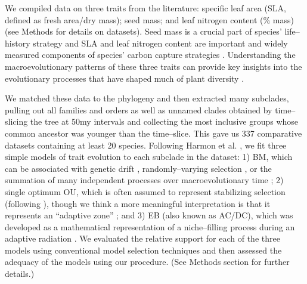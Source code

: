 \documentclass[a4paper,12pt]{article}
\begin{document}
We compiled data on three traits from the literature: specific leaf area (SLA, defined as fresh area/dry mass); seed mass; and leaf nitrogen content (\% mass) (see Methods for details on datasets). Seed mass is a crucial part of species' life--history strategy \citep{Leishman2000, Westoby2002} and SLA and leaf nitrogen content are important and widely measured components of species' carbon capture strategies \citep{Wright2004}. Understanding the macroevolutionary patterns of these three traits can provide key insights into the evolutionary processes that have shaped much of plant diversity \citep{ksi}.  

We matched these data to the phylogeny and then extracted many subclades, pulling out all families and orders as well as unnamed clades obtained by time--slicing the tree at 50my intervals and collecting the most inclusive groups whose common ancestor was younger than the time--slice. This gave us 337 comparative datasets containing at least 20 species.
Following Harmon et al. \citep{Harmon2010}, we fit three simple models of trait evolution to each subclade in the dataset: 1) BM, which can be associated with genetic drift \citep{Lande1976, Felsenstein1988, Lynch1990, HansenMartins1996}, randomly--varying selection \citep{Felsenstein1973}, or the summation of many independent processes over macroevolutionary time \citep{HansenMartins1996, Uyeda2011, PennellPE}; 2) single optimum OU, which is often assumed to represent stabilizing selection (following \citep{Lande1976}), though we think a more meaningful interpretation is that it represents an ``adaptive zone'' \citep{Hansen2012book, PennellHarmon}; and 3) EB (also known as AC/DC), which was developed as a mathematical representation of a niche--filling process during an adaptive radiation \citep{Blomberg2003, Harmon2010, SlaterPennell}. We evaluated the relative support for each of the three models using conventional model selection techniques and then assessed the adequacy of the models using our procedure. (See Methods section for further details.) 
\end{document}
